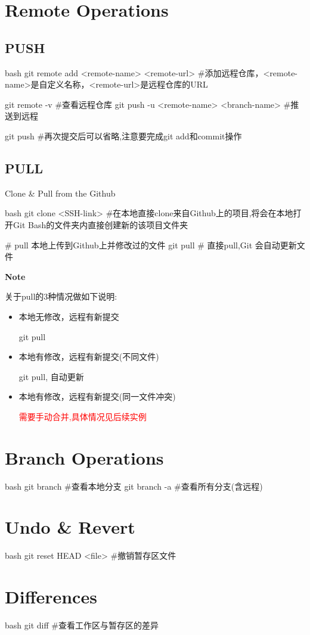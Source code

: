\section{Remote Operations}
\subsection{PUSH}
\begin{myminted}{bash}
    git remote add <remote-name> <remote-url> #添加远程仓库，<remote-name>是自定义名称，<remote-url>是远程仓库的URL

    git remote -v #查看远程仓库
    git push -u <remote-name> <branch-name> #推送到远程

    git push #再次提交后可以省略,注意要完成git add和commit操作
\end{myminted}

\subsection{PULL}

Clone \& Pull from the Github
\begin{myminted}{bash}
    git clone <SSH-link> #在本地直接clone来自Github上的项目,将会在本地打开Git Bash的文件夹内直接创建新的该项目文件夹

    # pull 本地上传到Github上并修改过的文件
    git pull # 直接pull,Git 会自动更新文件
\end{myminted}
\textbf{Note}

关于pull的3种情况做如下说明:
\begin{itemize}
    \item 本地无修改，远程有新提交
    
    git pull 
    \item 本地有修改，远程有新提交(不同文件)
    
    git pull, 自动更新
    \item 本地有修改，远程有新提交(同一文件冲突)
    
    \textcolor{red}{需要手动合并,具体情况见后续实例}
\end{itemize}

\section{Branch Operations}
\begin{myminted}{bash}
    git branch  #查看本地分支
    git branch -a  #查看所有分支(含远程)
\end{myminted}



\section{Undo \& Revert}
\begin{myminted}{bash}
    git reset HEAD <file> #撤销暂存区文件
\end{myminted}

\section{Differences}
\begin{myminted}{bash}
    git diff #查看工作区与暂存区的差异
\end{myminted}